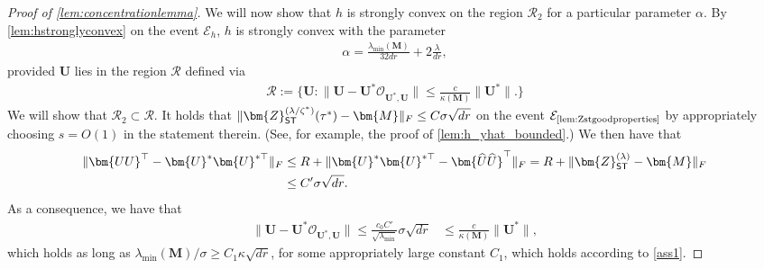 \documentclass[10pt]{article}
\newcommand{\s}{^*}
\renewcommand{\t}{^{\top}}
\renewcommand{\hat}{\widehat}
\theoremstyle{definition}
\begin{document}
\begin{proof}[Proof of \cref{lem:concentrationlemma}]
We will now show that $h$ is strongly convex on the region $\mathcal{R}_2$ for a particular parameter $\alpha$.  By \cref{lem:hstronglyconvex} on the event $\mathcal{E}_h$, $h$ is strongly convex with the parameter 
\begin{align}
    \alpha =  \frac{\lambda_{\min}(\bm{M})}{32 dr} + 2 \frac{\lambda}{dr},
\end{align}
provided $\bm{U}$ lies in the region $\mathcal{R}$ defined via
\begin{align}
    \mathcal{R} := \bigg\{ \bm{U}: \| \bm{U} - \bm{U}\s \mathcal{O}_{\bm{U}\s, \bm{U}} \| \leq \frac{c}{\kappa(\bm{M})} \|\bm{U}\s \|.\bigg\} 
\end{align}
We will show that $\mathcal{R}_2 \subset \mathcal{R}$. 
It holds that $\|\bm{Z}_{{\sf ST}}^{(\lambda/\zeta\s)}(\tau\s) - \bm{M} \|_F \leq C \sigma \sqrt{dr}$ on the event $\mathcal{E}_{\text{\cref{lem:Zstgoodproperties}}}$ by appropriately choosing $s = O(1)$ in the statement therein.  (See, for example, the proof of \cref{lem:h_yhat_bounded}.)  We then have that 
\begin{align}
    \| \bm{UU}\t - \bm{U}\s \bm{U}^{*\top} \|_F &\leq R + \|  \bm{U}\s \bm{U}^{*\top} -\bm{\hat U \hat U}\t \|_F = R + \| \bm{Z}_{{\sf ST}}^{(\lambda)} - \bm{M} \|_F \\
    &\leq C' \sigma \sqrt{dr}.
\end{align} 
As a consequence, we have that
\begin{align}
    \| \bm{U} - \bm{U}\s \mathcal{O}_{\bm{U}\s,\bm{U}} \| \leq  \frac{c_0 C'}{\sqrt{\lambda_{\min}}} \sigma \sqrt{dr} 
    &\leq \frac{c}{\kappa(\bm{M})} \| \bm{U}\s \|,
\end{align}
which holds as long as  $\lambda_{\min}(\bm{M})/\sigma \geq C_1 \kappa \sqrt{dr}$, for some appropriately large constant $C_1$, which holds according to \cref{ass1}.  



\end{proof}
\end{document}
